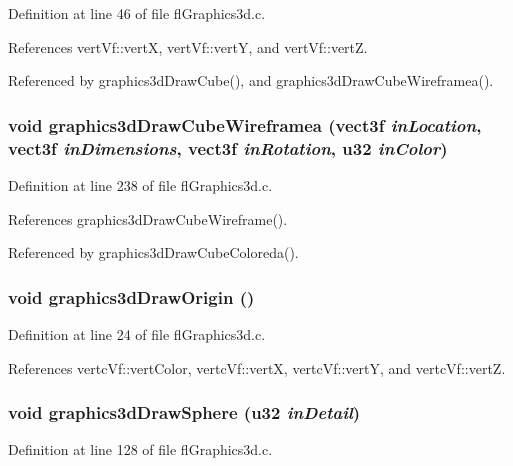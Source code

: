 Definition at line 46 of file fl\-Graphics3d.c.

References vert\-Vf::vert\-X, vert\-Vf::vert\-Y, and vert\-Vf::vert\-Z.

Referenced by graphics3d\-Draw\-Cube(), and graphics3d\-Draw\-Cube\-Wireframea().
\subsubsection{\setlength{\rightskip}{0pt plus 5cm}void graphics3d\-Draw\-Cube\-Wireframea ({\bf vect3f} {\em in\-Location}, {\bf vect3f} {\em in\-Dimensions}, {\bf vect3f} {\em in\-Rotation}, u32 {\em in\-Color})}\label{flGraphics3d_8c_e30ad6cfdb58334a287b0400a0ebf38f}




Definition at line 238 of file fl\-Graphics3d.c.

References graphics3d\-Draw\-Cube\-Wireframe().

Referenced by graphics3d\-Draw\-Cube\-Coloreda().
\subsubsection{\setlength{\rightskip}{0pt plus 5cm}void graphics3d\-Draw\-Origin ()}\label{flGraphics3d_8c_70cda2b57491cf276d3ad0c401f59abd}




Definition at line 24 of file fl\-Graphics3d.c.

References vertc\-Vf::vert\-Color, vertc\-Vf::vert\-X, vertc\-Vf::vert\-Y, and vertc\-Vf::vert\-Z.
\subsubsection{\setlength{\rightskip}{0pt plus 5cm}void graphics3d\-Draw\-Sphere (u32 {\em in\-Detail})}\label{flGraphics3d_8c_43c11eb10953728f60e288499ce1edd8}




Definition at line 128 of file fl\-Graphics3d.c.

